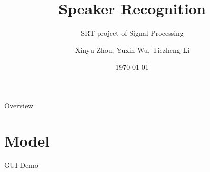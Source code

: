 \documentclass {beamer}
\title{Speaker Recognition}
\subtitle{SRT project of Signal Processing}
\author {Xinyu Zhou, Yuxin Wu, Tiezheng Li}
\institute{
  Department of Computer Science and Technology\\
  Tsinghua University\\
}
\date{\today}
\theoremstyle{plain}
\begin{document}
\frame[plain]{\titlepage}

\begin{frame}{Overview}
\tableofcontents
\end{frame}



\section{Model}



\begin{frame}{GUI Demo}

\end{frame}
\end{document}
